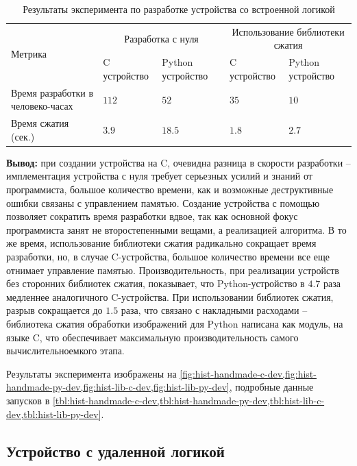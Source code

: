 \begin{longtable}{| p{3cm} | p{3cm} | p{3cm} | p{3cm} | p{3cm} |}
    \caption{Результаты эксперимента по разработке устройства со встроенной логикой}\label{tbl:inner-logic} \\
    \hline
        \multirow{2}{*}{Метрика} &
        \multicolumn{2}{c|}{Разработка с нуля} &
        \multicolumn{2}{c|}{Использование библиотеки сжатия} \\
    \cline{2-5} &
        C устройство &
        Python устройство &
        C устройство &
        Python устройство \\
    \hline
        Время разработки в человеко-часах &
        $112$ &
        $52$ &
        $35$ &
        $10$ \\
    \hline
        Время сжатия (сек.)&
        $3.9$   &
        $18.5$  &
        $1.8$   &
        $2.7$   \\
    \hline
\end{longtable}

\textbf{Вывод:} при создании устройства на C, очевидна разница
в скорости разработки -- имплементация устройства с нуля
требует серьезных усилий и знаний от программиста, большое количество
времени, как и возможные деструктивные ошибки связаны с управлением
памятью. Создание устройства с помощью {\mylanguage} позволяет
сократить время разработки вдвое, так как основной фокус программиста
занят не второстепенными вещами, а реализацией алгоритма.
В то же время, использование библиотеки сжатия радикально сокращает
время разработки, но, в случае C-устройства, большое количество
времени все еще отнимает управление памятью.
Производительность, при реализации устройств без сторонних
библиотек сжатия, показывает, что Python-устройство в $4.7$ раза
медленнее аналогичного C-устройства. При использовании
библиотек сжатия, разрыв сокращается до $1.5$ раза, что связано
с накладными расходами -- библиотека сжатия обработки изображений
для Python написана как модуль, на языке C, что обеспечивает
максимальную производительность самого вычислительноемкого этапа.

Результаты эксперимента изображены на \cref{fig:hist-handmade-c-dev,fig:hist-handmade-py-dev,fig:hist-lib-c-dev,fig:hist-lib-py-dev},
подробные данные запусков в
\cref{tbl:hist-handmade-c-dev,tbl:hist-handmade-py-dev,tbl:hist-lib-c-dev,tbl:hist-lib-py-dev}.

\subsection{Устройство с удаленной логикой}\label{sec:ch3/sec2/sec2}

